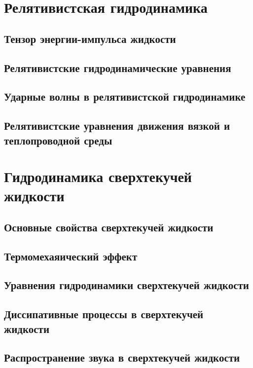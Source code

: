 \documentclass[12pt,a4paper]{book}
\begin{document}
\chapter{Релятивистская гидродинамика}
\section{Тензор энергии-импульса жидкости}\label{sec:p133}
\section{Релятивистские гидродинамические уравнения}\label{sec:p134}
\section{Ударные волны в релятивистской гидродинамике}\label{sec:p135}
\section{Релятивистские уравнения движения вязкой и теплопроводной среды}\label{sec:p136}

\chapter{Гидродинамика сверхтекучей жидкости}
\section{Основные свойства сверхтекучей жидкости}\label{sec:p137}
\section{Термомехаяический эффект}\label{sec:p138}
\section{Уравнения гидродинамики сверхтекучей жидкости}\label{sec:p139}
\section{Диссипативные процессы в сверхтекучей жидкости}\label{sec:p140}
\section{Распространение звука в сверхтекучей жидкости}\label{sec:p141}
\end{document}

